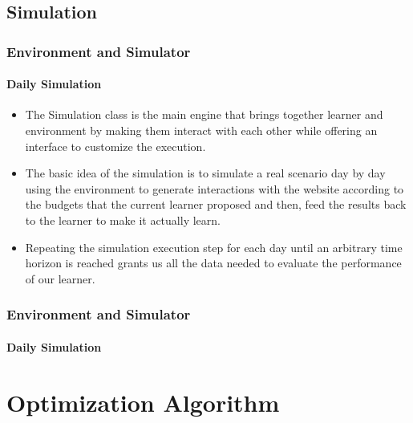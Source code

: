 \documentclass[11pt]{beamer}
\begin{document}

\subsection{Simulation}


\begin{frame}

\frametitle{Environment and Simulator}
\framesubtitle{Daily Simulation}

\begin{itemize}[leftmargin=*, label={$\circ$}]
    \item The Simulation class is the main engine that brings together learner and environment by making them interact with each other while offering an interface to customize the execution.
    \item The basic idea of the simulation is to simulate a real scenario day by day using the environment to generate interactions with the website according to the budgets that the current learner proposed and then, feed the results back to the learner to make it actually learn.
    \item Repeating the simulation execution step for each day until an arbitrary time horizon is reached grants us all the data needed to evaluate the performance of our learner.
\end{itemize}

\end{frame}


\begin{frame}

\frametitle{Environment and Simulator}
\framesubtitle{Daily Simulation}


\end{frame}


\AtBeginSection[]
{
\begin{frame}{}
    \tableofcontents[sections={\thesection}]
\end{frame}
}


\section{Optimization Algorithm}
\end{document}

